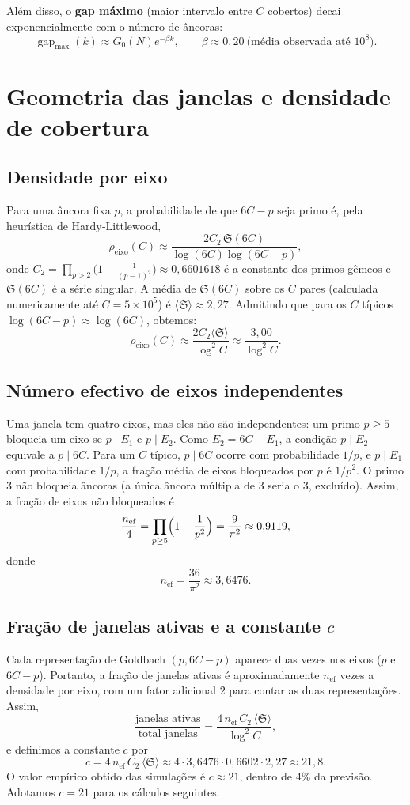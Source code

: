 \documentclass[11pt]{article}
\theoremstyle{definition}
\begin{document}
	Além disso, o \textbf{gap máximo} (maior intervalo entre $C$ cobertos) decai exponencialmente com o número de âncoras:
	\[
	\operatorname{gap}_{\max}(k) \approx G_0(N) e^{-\beta k},\qquad \beta \approx 0{,}20\ \text{(média observada até }10^8\text{)}.
	\]
	
	\section{Geometria das janelas e densidade de cobertura}
	
	\subsection{Densidade por eixo}
	Para uma âncora fixa $p$, a probabilidade de que $6C-p$ seja primo é, pela heurística de Hardy‑Littlewood,
	\[
	\rho_{\text{eixo}}(C) \approx \frac{2C_2\,\mathfrak{S}(6C)}{\log(6C)\log(6C-p)},
	\]
	onde $C_2 = \prod_{p>2}\bigl(1-\frac1{(p-1)^2}\bigr) \approx 0{,}6601618$ é a constante dos primos gêmeos e $\mathfrak{S}(6C)$ é a série singular. A média de $\mathfrak{S}(6C)$ sobre os $C$ pares (calculada numericamente até $C=5\times10^5$) é $\langle\mathfrak{S}\rangle \approx 2{,}27$. Admitindo que para os $C$ típicos $\log(6C-p)\approx\log(6C)$, obtemos:
	\[
	\rho_{\text{eixo}}(C) \approx \frac{2C_2\langle\mathfrak{S}\rangle}{\log^2 C} \approx \frac{3{,}00}{\log^2 C}.
	\]
	
	\subsection{Número efectivo de eixos independentes}
	Uma janela tem quatro eixos, mas eles não são independentes: um primo $p\ge5$ bloqueia um eixo se $p\mid E_1$ e $p\mid E_2$. Como $E_2=6C-E_1$, a condição $p\mid E_2$ equivale a $p\mid6C$. Para um $C$ típico, $p\mid6C$ ocorre com probabilidade $1/p$, e $p\mid E_1$ com probabilidade $1/p$, a fração média de eixos bloqueados por $p$ é $1/p^2$. O primo $3$ não bloqueia âncoras (a única âncora múltipla de $3$ seria o $3$, excluído). Assim, a fração de eixos não bloqueados é
	\[
	\frac{n_{\text{ef}}}{4} = \prod_{p\ge5}\Bigl(1-\frac1{p^2}\Bigr) = \frac{9}{\pi^2} \approx 0{,}9119,
	\]
	donde
	\[
	n_{\text{ef}} = \frac{36}{\pi^2} \approx 3{,}6476.
	\]
	
	\subsection{Fração de janelas ativas e a constante $c$}
	Cada representação de Goldbach $(p,6C-p)$ aparece duas vezes nos eixos ($p$ e $6C-p$). Portanto, a fração de janelas ativas é aproximadamente $n_{\text{ef}}$ vezes a densidade por eixo, com um fator adicional $2$ para contar as duas representações. Assim,
	\[
	\frac{\text{janelas ativas}}{\text{total janelas}} = \frac{4\,n_{\text{ef}}\,C_2\,\langle\mathfrak{S}\rangle}{\log^2 C},
	\]
	e definimos a constante $c$ por
	\[
	c = 4\,n_{\text{ef}}\,C_2\,\langle\mathfrak{S}\rangle \approx 4\cdot3{,}6476\cdot0{,}6602\cdot2{,}27 \approx 21{,}8.
	\]
	O valor empírico obtido das simulações é $c\approx21$, dentro de $4\%$ da previsão. Adotamos $c=21$ para os cálculos seguintes.
	
\end{document}
